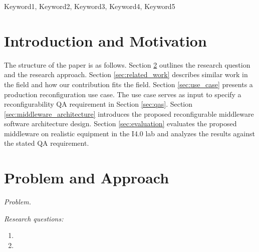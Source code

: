 \documentclass[conference]{IEEEtran}
\begin{document}
\maketitle
\IEEEpubidadjcol
\begin{abstract}

    



\end{abstract}

\begin{IEEEkeywords}
Keyword1, Keyword2, Keyword3, Keyword4, Keyword5
\end{IEEEkeywords}

\section{Introduction and Motivation}






The structure of the paper is as follows. 
Section \ref{sec:problem} outlines the research question and the research approach. 
Section \ref{sec:related_work} describes similar work in the field and how our contribution fits the field.
Section \ref{sec:use_case} presents a production reconfiguration use case.
The use case serves as input to specify a reconfigurability QA requirement in Section \ref{sec:qas}.
Section \ref{sec:middleware_architecture} introduces the proposed reconfigurable middleware software architecture design.
Section \ref{sec:evaluation} evaluates the proposed middleware on realistic equipment in the I4.0 lab and analyzes the results against the stated QA requirement.   

\section{Problem and Approach}

\label{sec:problem}
\emph{Problem.}
  

\emph{Research questions:}
\begin{enumerate}
    \item  
    \item 
\end{enumerate}
\end{document}
